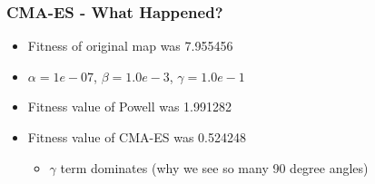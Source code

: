 \documentclass[12pt,t,xcolor=dvipsnames]{beamer}
\begin{document}
\begin{frame}
{\begin{center}
    \end{center}
  }%
\end{frame}


\begin{frame}
  \frametitle{CMA-ES - What Happened?}

  \begin{itemize}
  \item Fitness of original map was 7.955456
  \item $\alpha=1e-07$, $\beta=1.0e-3$, $\gamma=1.0e-1$
  \item Fitness value of Powell was 1.991282
  \item Fitness value of CMA-ES was 0.524248
    \begin{itemize}
    \item $\gamma$ term dominates (why we see so many 90 degree angles)
    \end{itemize}
  \end{itemize}

  

\end{frame}


%
%  
%  
\end{document}
